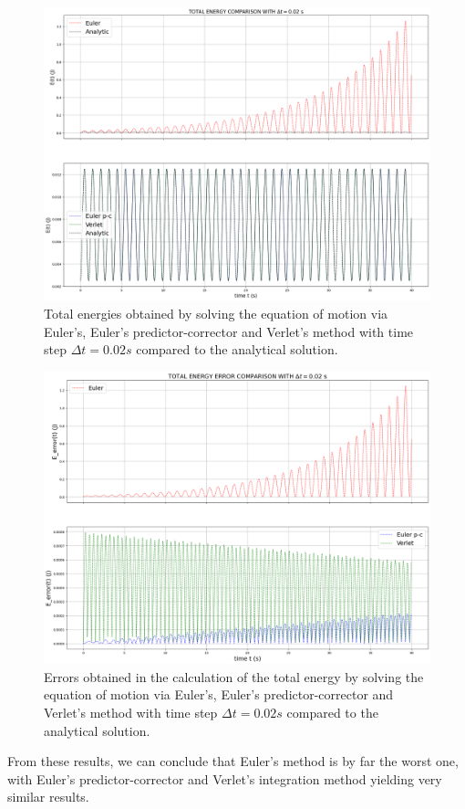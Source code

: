 \documentclass{article}
\begin{document}
\begin{figure}[h!]
 \centering
  \includegraphics[width=0.7\linewidth]{E_eq_motion.png}
  \caption{Total energies obtained by solving the equation of motion via Euler's, Euler's predictor-corrector and Verlet's method with time step $\Delta t=0.02 s$ compared to the analytical solution.}
  \label{fig:E_three_methods}
\end{figure}
\begin{figure}[h!]
 \centering
  \includegraphics[width=0.7\linewidth]{E_error_eq_motion.png}
  \caption{Errors obtained in the calculation of the total energy by solving the equation of motion via Euler's, Euler's predictor-corrector and Verlet's method with time step $\Delta t=0.02 s$ compared to the analytical solution.}
  \label{fig:E_error_three_methods}
\end{figure}
From these results, we can conclude that Euler's method is by far the worst one, with Euler's predictor-corrector and Verlet's integration method yielding very similar results.
\end{document}

